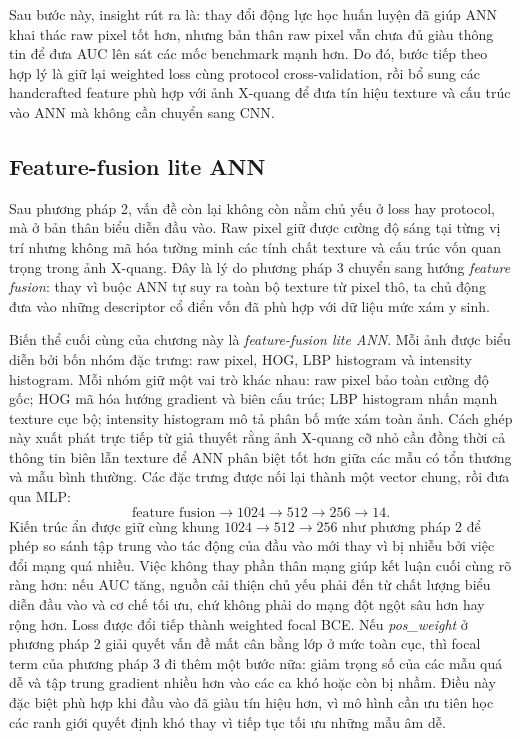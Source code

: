 Sau bước này, insight rút ra là: thay đổi động lực học huấn luyện đã giúp ANN khai thác raw pixel tốt hơn, nhưng bản thân raw pixel vẫn chưa đủ giàu thông tin để đưa AUC lên sát các mốc benchmark mạnh hơn. Do đó, bước tiếp theo hợp lý là giữ lại weighted loss cùng protocol cross-validation, rồi bổ sung các handcrafted feature phù hợp với ảnh X-quang để đưa tín hiệu texture và cấu trúc vào ANN mà không cần chuyển sang CNN.

\subsection{Feature-fusion lite ANN}

Sau phương pháp 2, vấn đề còn lại không còn nằm chủ yếu ở loss hay protocol, mà ở bản thân biểu diễn đầu vào. Raw pixel giữ được cường độ sáng tại từng vị trí nhưng không mã hóa tường minh các tính chất texture và cấu trúc vốn quan trọng trong ảnh X-quang. Đây là lý do phương pháp 3 chuyển sang hướng \textit{feature fusion}: thay vì buộc ANN tự suy ra toàn bộ texture từ pixel thô, ta chủ động đưa vào những descriptor cổ điển vốn đã phù hợp với dữ liệu mức xám y sinh.

Biến thể cuối cùng của chương này là \textit{feature-fusion lite ANN}. Mỗi ảnh được biểu diễn bởi bốn nhóm đặc trưng: raw pixel, HOG, LBP histogram và intensity histogram. Mỗi nhóm giữ một vai trò khác nhau: raw pixel bảo toàn cường độ gốc; HOG mã hóa hướng gradient và biên cấu trúc; LBP histogram nhấn mạnh texture cục bộ; intensity histogram mô tả phân bố mức xám toàn ảnh. Cách ghép này xuất phát trực tiếp từ giả thuyết rằng ảnh X-quang cỡ nhỏ cần đồng thời cả thông tin biên lẫn texture để ANN phân biệt tốt hơn giữa các mẫu có tổn thương và mẫu bình thường. Các đặc trưng được nối lại thành một vector chung, rồi đưa qua MLP:
\[
\text{feature fusion} \rightarrow 1024 \rightarrow 512 \rightarrow 256 \rightarrow 14.
\]
Kiến trúc ẩn được giữ cùng khung $1024 \rightarrow 512 \rightarrow 256$ như phương pháp 2 để phép so sánh tập trung vào tác động của đầu vào mới thay vì bị nhiễu bởi việc đổi mạng quá nhiều. Việc không thay phần thân mạng giúp kết luận cuối cùng rõ ràng hơn: nếu AUC tăng, nguồn cải thiện chủ yếu phải đến từ chất lượng biểu diễn đầu vào và cơ chế tối ưu, chứ không phải do mạng đột ngột sâu hơn hay rộng hơn. Loss được đổi tiếp thành weighted focal BCE. Nếu \textit{pos\_weight} ở phương pháp 2 giải quyết vấn đề mất cân bằng lớp ở mức toàn cục, thì focal term của phương pháp 3 đi thêm một bước nữa: giảm trọng số của các mẫu quá dễ và tập trung gradient nhiều hơn vào các ca khó hoặc còn bị nhầm. Điều này đặc biệt phù hợp khi đầu vào đã giàu tín hiệu hơn, vì mô hình cần ưu tiên học các ranh giới quyết định khó thay vì tiếp tục tối ưu những mẫu âm dễ.

